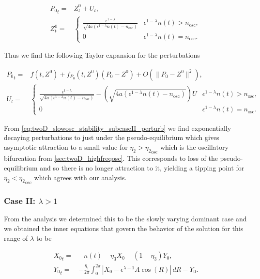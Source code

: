 \begin{equation}
\begin{aligned}
{P_0}_t =& Z^0_t+U_t,\\
Z^0_t=&\begin{cases}
\frac{\epsilon^{1-\lambda}}{\sqrt{4a(\epsilon^{1-\lambda}n(t)-n_{\text{osc}})}} & \epsilon^{1-\lambda}n(t)>n_{\text{osc}},\\
0 & \epsilon^{1-\lambda}n(t)=n_{\text{osc}}.
\end{cases}
\end{aligned}
\end{equation}

Thus we find the following Taylor expansion for the perturbations

\begin{equation}\label{eq:twoD_slowosc_stability_subcaseII_perturb}
\begin{aligned}
{P_0}_t =& f(t,Z^0)+f_{P_0}(t,Z^0)(P_0-Z^0)+O(\lVert P_0-Z^0 \rVert^2),\\
 U_t = & \begin{cases}
\frac{\epsilon^{1-\lambda}}{\sqrt{4a(\epsilon^{1-\lambda}n(t)-n_{\text{osc}})}}-\left(\sqrt{4a(\epsilon^{1-\lambda}n(t)-n_{\text{osc}})}\right) U & \epsilon^{1-\lambda}n(t)>n_{\text{osc}},\\
0 & \epsilon^{1-\lambda}n(t)=n_{\text{osc}}.
\end{cases}
\end{aligned}
\end{equation}

From \eqref{eq:twoD_slowosc_stability_subcaseII_perturb} we find exponentially decaying perturbations to just under the pseudo-equilibrium which gives asymptotic attraction to a small value for $\eta_2>{\eta_2}_{\text{osc}}$ which is the oscillatory bifurcation from \autoref{sec:twoD_highfreqosc}. This corresponds to loss of the pseudo-equilibrium and so there is no longer attraction to it, yielding a tipping point for $\eta_2<{\eta_2}_{\text{osc}}$ which agrees with our analysis.

\subsubsection{Case II: $\lambda>1$}

From the analysis we determined this to be the slowly varying dominant case and we obtained the inner equations that govern the behavior of the solution for this range of $\lambda$ to be

\begin{equation}\label{eq:twoD_slowosc_caseII_full}
\begin{aligned}
{X_0}_t =& - n(t)-\eta_3 X_0 -(1-\eta_3)Y_0,\\
{Y_0}_t =& -\frac{\eta_1}{2\pi}\int_0^{2\pi}|X_0-\epsilon^{\lambda-1} A\cos(R)|\,dR - Y_0.
\end{aligned}
\end{equation}

